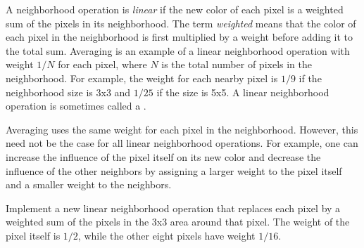\documentclass{book}
\begin{document}
A neighborhood operation is \emph{linear} if the new color of each pixel is a weighted sum of the pixels in its neighborhood. The term \emph{weighted} means that the color of each pixel in the neighborhood is first multiplied by a weight before adding it to the total sum. Averaging is an example of a linear neighborhood operation with weight $1/N$ for each pixel, where $N$ is the total number of pixels in the neighborhood. For example, the weight for each nearby pixel is $1/9$ if the neighborhood size is 3x3 and $1/25$ if the size is 5x5. A linear neighborhood operation is sometimes called a .

Averaging uses the same weight for each pixel in the neighborhood. However, this need not be the case for all linear neighborhood operations. For example, one can increase the influence of the pixel itself on its new color and decrease the influence of the other neighbors by assigning a larger weight to the pixel itself and a smaller weight to the neighbors.

\begin{exercise}\label{ex:diffweights}
Implement a new linear neighborhood operation that replaces each pixel by a weighted sum of the pixels in the 3x3 area around that pixel. The weight of the pixel itself is $1/2$, while the other eight pixels have weight $1/16$.
\end{exercise}
\end{document}
